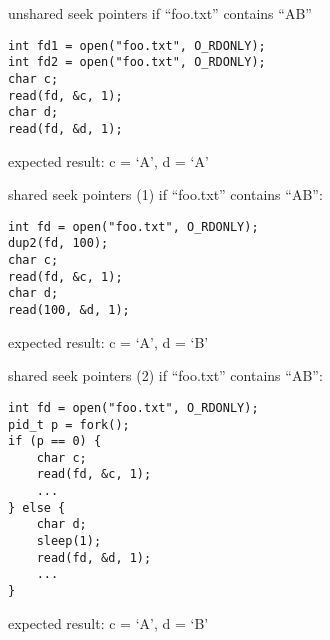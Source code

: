

\begin{frame}[fragile]{unshared seek pointers}
if ``foo.txt'' contains ``AB''
\begin{Verbatim}[fontsize=\small]
int fd1 = open("foo.txt", O_RDONLY);
int fd2 = open("foo.txt", O_RDONLY);
char c;
read(fd, &c, 1);
char d;
read(fd, &d, 1);
\end{Verbatim}
expected result: c = `A', d = `A'
\end{frame}


\begin{frame}[fragile]{shared seek pointers (1)}
if ``foo.txt'' contains ``AB'':
\begin{Verbatim}[fontsize=\small]
int fd = open("foo.txt", O_RDONLY);
dup2(fd, 100);
char c;
read(fd, &c, 1);
char d;
read(100, &d, 1);
\end{Verbatim}
expected result: c = `A', d = `B'
\end{frame}

\begin{frame}[fragile]{shared seek pointers (2)}
if ``foo.txt'' contains ``AB'':
\begin{Verbatim}[fontsize=\small]
int fd = open("foo.txt", O_RDONLY);
pid_t p = fork();
if (p == 0) {
    char c;
    read(fd, &c, 1);
    ...
} else {
    char d;
    sleep(1);
    read(fd, &d, 1);
    ...
}
\end{Verbatim}
expected result: c = `A', d = `B'
\end{frame}

